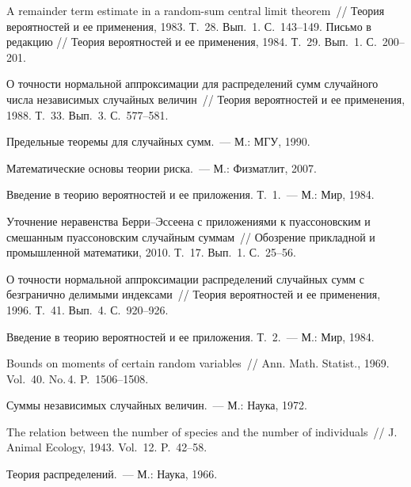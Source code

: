 \begin{multicols}{2}
{\small\frenchspacing
{%
\begin{thebibliography}{99}

 A remainder term estimate in a random-sum central limit theorem~// Теория
вероятностей и ее применения, 1983. Т.~28. Вып.~1. С.~143--149.
Письмо в редакцию // Теория вероятностей и ее применения, 1984. Т.~29. Вып.~1. С.~200--201.

О точности нормальной аппроксимации для распределений сумм случайного числа
 независимых случайных величин~// Теория вероятностей и ее
применения, 1988. Т.~33. Вып.~3. С.~577--581.

Предельные
теоремы для случайных сумм.~--- М.: МГУ, 1990.

Математические основы теории риска.~--- М.: Физматлит, 2007.

 Введение в теорию вероятностей и ее приложения. Т.~1.~--- М.: Мир,
1984.

 Уточнение неравенства
Берри--Эссеена с приложениями к пуассоновским и смешанным
пуассоновским случайным суммам~// Обозрение прикладной и
промышленной математики, 2010. Т.~17. Вып.~1. С.~25--56.


 О точности нормальной аппроксимации распределений случайных сумм с
безгранично делимыми индексами~// Теория вероятностей и ее
применения, 1996. Т.~41. Вып.~4. С.~920--926.

Введение в теорию вероятностей и ее приложения. Т.~2.~--- М.: Мир,
1984.


 Bounds on moments of certain random
variables~// Ann. Math. Statist., 1969. Vol.~40. No.\,4. P.~1506--1508.

 Суммы независимых случайных
величин.~--- М.: Наука, 1972.

  The
relation between the number of species and the number of
individuals~// J. Animal Ecology, 1943. Vol.~12. P.~42--58.

 \label{end\stat}

  Теория
распределений.~--- М.: Наука, 1966.
 \end{thebibliography}
}
}


\end{multicols}